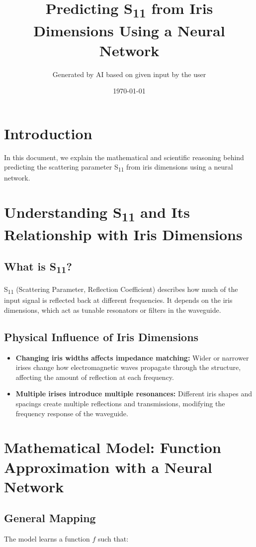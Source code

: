 \documentclass{article}
\title{Predicting S\textsubscript{11} from Iris Dimensions Using a Neural Network}
\author{Generated by AI based on given input by the user}
\date{\today}
\begin{document}
\maketitle

\section{Introduction}
In this document, we explain the mathematical and scientific reasoning behind predicting the scattering parameter S\textsubscript{11} from iris dimensions using a neural network.

\section{Understanding S\textsubscript{11} and Its Relationship with Iris Dimensions}
\subsection{What is S\textsubscript{11}?}
S\textsubscript{11} (Scattering Parameter, Reflection Coefficient) describes how much of the input signal is reflected back at different frequencies. It depends on the iris dimensions, which act as tunable resonators or filters in the waveguide.

\subsection{Physical Influence of Iris Dimensions}
\begin{itemize}
    \item \textbf{Changing iris widths affects impedance matching:} Wider or narrower irises change how electromagnetic waves propagate through the structure, affecting the amount of reflection at each frequency.
    \item \textbf{Multiple irises introduce multiple resonances:} Different iris shapes and spacings create multiple reflections and transmissions, modifying the frequency response of the waveguide.
\end{itemize}

\section{Mathematical Model: Function Approximation with a Neural Network}
\subsection{General Mapping}
The model learns a function \( f \) such that:
\end{document}
